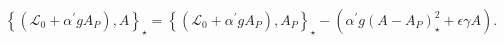 \begin{equation}
\left\{ \left( \mathcal{L}_{0}+\alpha ^{\prime }gA_{P}\right)
,A\right\} _{\star }=\left\{ \left( \mathcal{L}_{0}+\alpha
^{\prime }gA_{P}\right) ,A_{P}\right\} _{\star }- \left( \alpha
^{\prime }g\left( A-A_{P}\right) _{\star }^{2}+\epsilon\gamma
A\right) .
\end{equation}%
